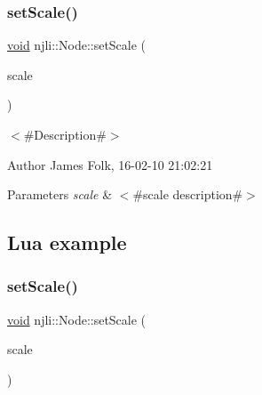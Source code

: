 \begin{DoxyCodeInclude}
\end{DoxyCodeInclude}
\mbox{\label{classnjli_1_1_node_a765aaabc294a7c30171b86d22fe31a43}} 
\subsubsection{\texorpdfstring{set\+Scale()}{setScale()}\hspace{0.1cm}{\footnotesize\ttfamily [1/2]}}
{\footnotesize\ttfamily \mbox{\hyperlink{_thread_8h_af1e856da2e658414cb2456cb6f7ebc66}{void}} njli\+::\+Node\+::set\+Scale (\begin{DoxyParamCaption}\item[{const bt\+Vector3 \&}]{scale }\end{DoxyParamCaption})}



$<$\#\+Description\#$>$ 

\begin{DoxyAuthor}{Author}
James Folk, 16-\/02-\/10 21\+:02\+:21
\end{DoxyAuthor}

\begin{DoxyParams}{Parameters}
{\em scale} & $<$\#scale description\#$>$\\
\hline
\end{DoxyParams}
\hypertarget{classnjli_1_1_steering_behavior_wander_ex1}{}\subsection{Lua example}\label{classnjli_1_1_steering_behavior_wander_ex1}

\begin{DoxyCodeInclude}
\end{DoxyCodeInclude}
\mbox{\label{classnjli_1_1_node_a82b119a67be08f51cb55e2488abc8eb9}} 
\subsubsection{\texorpdfstring{set\+Scale()}{setScale()}\hspace{0.1cm}{\footnotesize\ttfamily [2/2]}}
{\footnotesize\ttfamily \mbox{\hyperlink{_thread_8h_af1e856da2e658414cb2456cb6f7ebc66}{void}} njli\+::\+Node\+::set\+Scale (\begin{DoxyParamCaption}\item[{const \mbox{\hyperlink{_util_8h_a5f6906312a689f27d70e9d086649d3fd}{f32}}}]{scale }\end{DoxyParamCaption})}




